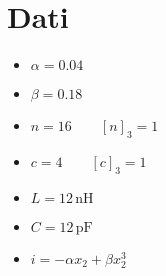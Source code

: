 \section*{Dati}
\begin{itemize}
    \item $\alpha = 0.04$
    \item $\beta = 0.18$
    \item $n = 16 \qquad [n]_3 = 1$
    \item $c = 4 \qquad [c]_3 = 1$
    \item $L = 12\,\textrm{nH}$
    \item $C = 12\,\textrm{pF}$
    \item $i = - \alpha x_2 + \beta x_2^3$
\end{itemize}
